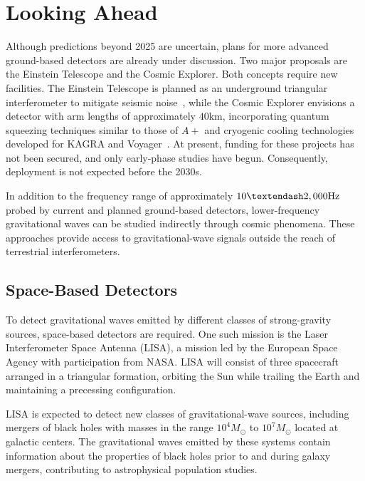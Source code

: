 \section{Looking Ahead}\label{sec:looking-ahead}


Although predictions beyond 2025 are uncertain, plans for more advanced ground-based detectors are already under discussion.
Two major proposals are the Einstein Telescope and the Cosmic Explorer.
Both concepts require new facilities.
The Einstein Telescope is planned as an underground triangular interferometer to mitigate seismic noise~\cite{etscienceteam_einstein_2011}, while the Cosmic Explorer envisions a detector with arm lengths of approximately  $40$km, incorporating quantum squeezing techniques similar to those of $A+$ and cryogenic cooling technologies developed for KAGRA and Voyager~\cite{hall_cosmic_2022}.
At present, funding for these projects has not been secured, and only early-phase studies have begun.
Consequently, deployment is not expected before the 2030s.


In addition to the frequency range of approximately $10\textendash2,000 \text{Hz}$ probed by current and planned ground-based detectors, lower-frequency gravitational waves can be studied indirectly through cosmic phenomena.
These approaches provide access to gravitational-wave signals outside the reach of terrestrial interferometers.

\subsection{Space-Based Detectors}\label{subsec:space-based-detectors}


To detect gravitational waves emitted by different classes of strong-gravity sources, space-based detectors are required.
One such mission is the Laser Interferometer Space Antenna (LISA), a mission led by the European Space Agency with participation from NASA. LISA will consist of three spacecraft arranged in a triangular formation, orbiting the Sun while trailing the Earth and maintaining a precessing configuration.


LISA is expected to detect new classes of gravitational-wave sources, including mergers of black holes with masses in the range $10^4 M_\odot$ to $10^7 M_\odot$ located at galactic centers.
The gravitational waves emitted by these systems contain information about the properties of black holes prior to and during galaxy mergers, contributing to astrophysical population studies.


